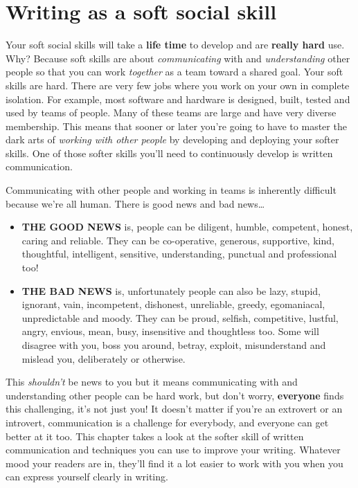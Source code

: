 \documentclass[
]{book}
\providecommand{\tightlist}{%
  \setlength{\itemsep}{0pt}\setlength{\parskip}{0pt}}
\begin{document}
\hypertarget{softwrite}{%
\section{Writing as a soft social skill}\label{softwrite}}

Your soft social skills will take a \textbf{life time} to develop and are \textbf{really hard} use. Why? Because soft skills are about \emph{communicating} with and \emph{understanding} other people so that you can work \emph{together} as a team toward a shared goal. Your soft skills are hard. There are very few jobs where you work on your own in complete isolation. For example, most software and hardware is designed, built, tested and used by teams of people. Many of these teams are large and have very diverse membership. This means that sooner or later you're going to have to master the dark arts of \emph{working with other people} by developing and deploying your softer skills. One of those softer skills you'll need to continuously develop is written communication.

Communicating with other people and working in teams is inherently difficult because we're all human. There is good news and bad news\ldots{}

\begin{itemize}
\tightlist
\item
  \textbf{THE GOOD NEWS} is, people can be diligent, humble, competent, honest, caring and reliable. They can be co-operative, generous, supportive, kind, thoughtful, intelligent, sensitive, understanding, punctual and professional too!
\item
  \textbf{THE BAD NEWS} is, unfortunately people can also be lazy, stupid, ignorant, vain, incompetent, dishonest, unreliable, greedy, egomaniacal, unpredictable and moody. They can be proud, selfish, competitive, lustful, angry, envious, mean, busy, insensitive and thoughtless too. Some will disagree with you, boss you around, betray, exploit, misunderstand and mislead you, deliberately or otherwise. \citep{sevendeadly}
\end{itemize}

This \emph{shouldn't} be news to you but it means communicating with and understanding other people can be hard work, but don't worry, \textbf{everyone} finds this challenging, it's not just you! It doesn't matter if you're an extrovert or an introvert, communication is a challenge for everybody, and everyone can get better at it too. This chapter takes a look at the softer skill of written communication and techniques you can use to improve your writing. Whatever mood your readers are in, they'll find it a lot easier to work with you when you can express yourself clearly in writing.
\end{document}
